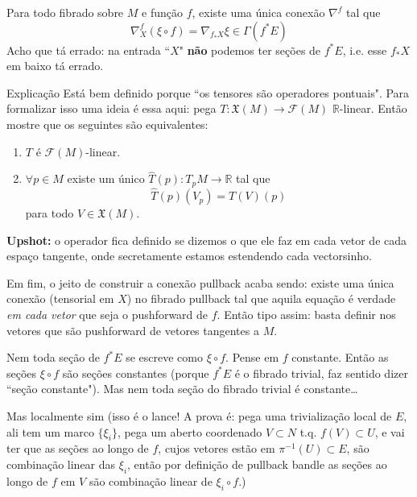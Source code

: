 \begin{prop}\leavevmode
Para todo fibrado sobre \(M\) e função \(f\), existe uma única conexão \(\nabla^f\) tal que
\[\nabla_X^f(\xi \circ f)=\nabla_{f_*X}\xi \in \Gamma(f^*E)\]
{\color{2}Acho que tá errado: na entrada  ``\(X\)" \textbf{não} podemos ter seções de \(f^*E\), i.e. esse \(f_*X\) em baixo tá errado.}
\end{prop}

\begin{thing8}{Explicação}\leavevmode
Está bem definido porque ``os tensores são operadores pontuais". Para formalizar isso uma ideia é essa aqui: pega \(T:\mathfrak{X}(M) \to \mathcal{F}(M)\) \(\mathbb{R}\)-linear. Então mostre que os seguintes são equivalentes:
\begin{enumerate}
\item \(T\) é \(\mathcal{F}(M)\)-linear.
\item \(\forall p \in M\) existe um único \(\hat{T}(p):T_pM \to \mathbb{R}\) tal que
	\[\hat{T}(p)(V_p)=T(V)(p)\]
	para todo \(V \in \mathfrak{X}(M)\).
\end{enumerate}
\textbf{Upshot:} o operador fica definido se dizemos o que ele faz em cada vetor de cada espaço tangente, onde secretamente estamos estendendo cada vectorsinho.

Em fim, o jeito de construir a conexão pullback acaba sendo: existe uma única conexão (tensorial em \(X\)) no fibrado pullback tal que aquila equação é verdade \textit{em cada vetor} que seja o pushforward de \(f\). Então tipo assim: basta definir nos vetores que são pushforward de vetores tangentes a \(M\).
\end{thing8}

\begin{remark}\leavevmode
Nem toda seção de \(f^*E\) se escreve como \(\xi \circ f\). Pense em \(f\) constante. Então as seções \(\xi \circ f\) são seções constantes (porque \(f^*E\) é o fibrado trivial, faz sentido dizer ``seção constante"). Mas nem toda seção do fibrado trivial é constante…

Mas localmente sim {\color{2}(isso é o lance! A prova é: pega uma trivialização local de \(E\), ali tem um marco \(\{\xi_i\}\), pega um aberto coordenado \(V \subset N\) t.q. \(f(V)\subset U\), e vai ter que as seções ao longo de \(f\), cujos vetores estão em \(\pi^{-1}(U)\subset E\), são combinação linear das \(\xi_i\), então por definição de pullback bandle as seções ao longo de \(f\) em \(V\) são combinação linear de \(\xi_i \circ f\).)}
\end{remark}

